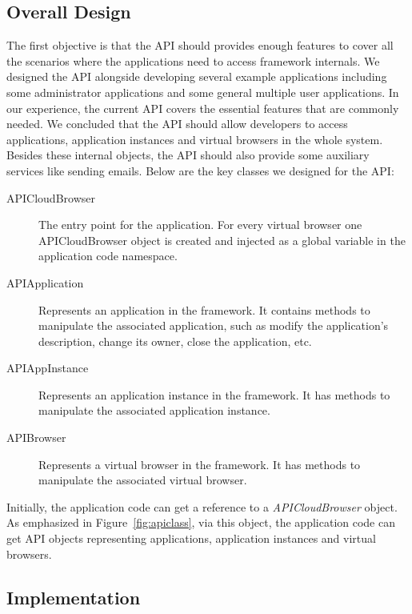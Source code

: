 \subsection{Overall Design}



The first objective is that the API should provides enough features to cover
all the scenarios where the applications need to access framework internals.
We designed the API alongside developing several example applications
including some administrator applications and some general multiple user
applications. In our experience, the current API covers the essential features
that are commonly needed. We concluded that the API should allow developers to
access applications, application instances and virtual browsers in the whole
system. Besides these internal objects, the API should also provide some
auxiliary services like sending emails. Below are the key classes we designed
for the API:

\begin{description}
\item[APICloudBrowser]
The entry point for the application.
For every virtual browser one APICloudBrowser object is created and injected as
a global variable in the application code namespace.

\item[APIApplication] Represents an application in the framework.
It contains methods to manipulate the associated application, such as modify the application's
description, change its owner, close the application, etc.

\item[APIAppInstance] Represents an application instance in the framework.
It has methods to manipulate the associated application instance.

\item[APIBrowser] Represents a virtual browser in the framework.
It has methods to manipulate the associated virtual browser.

\end{description}

\apiclassfig{}

Initially, the application code can get a reference to a
\emph{APICloudBrowser} object. As emphasized in
Figure~\ref{fig:apiclass}, via this object, the application code can get API
objects representing applications, application instances and virtual browsers.


\subsection{Implementation}

